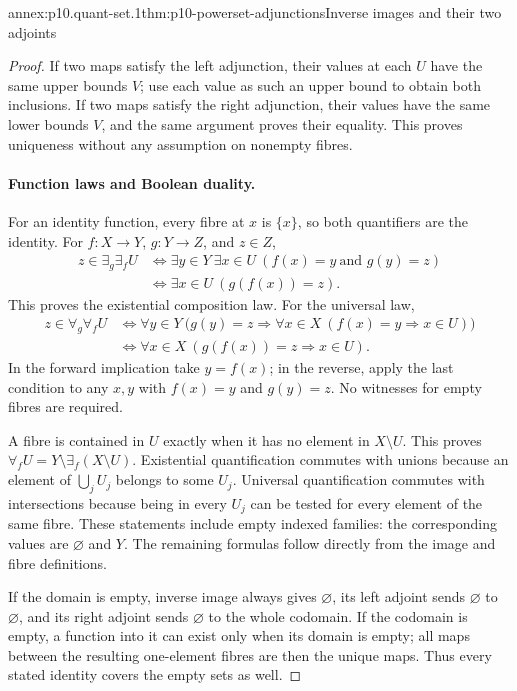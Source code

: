 \begin{annexitem}{annex:p10.quant-set.1}{thm:p10-powerset-adjunctions}{Inverse images and their two adjoints}
\begin{proof}
If two maps satisfy the left adjunction, their values at
each \(U\) have the same upper bounds \(V\); use each value
as such an upper bound to obtain both inclusions.
If two maps satisfy the right adjunction, their values
have the same lower bounds \(V\), and the same argument
proves their equality.
This proves uniqueness without any assumption on nonempty fibres.

\paragraph{Function laws and Boolean duality.}
For an identity function, every fibre at \(x\) is \(\{x\}\),
so both quantifiers are the identity.
For \(f:X\to Y\), \(g:Y\to Z\), and \(z\in Z\),
\[
\begin{aligned}
 z\in\exists_g\exists_fU
 &\Longleftrightarrow
     \exists y\in Y\ \exists x\in U\
                       (f(x)=y\ \text{and }g(y)=z)\\
 &\Longleftrightarrow
     \exists x\in U\ (g(f(x))=z).
\end{aligned}
\]
This proves the existential composition law.
For the universal law,
\[
\begin{aligned}
 z\in\forall_g\forall_fU
 &\Longleftrightarrow
   \forall y\in Y\
     \bigl(g(y)=z\Longrightarrow
       \forall x\in X\ (f(x)=y\Longrightarrow x\in U)\bigr)\\
 &\Longleftrightarrow
   \forall x\in X\ (g(f(x))=z\Longrightarrow x\in U).
\end{aligned}
\]
In the forward implication take \(y=f(x)\); in the reverse,
apply the last condition to any \(x,y\) with \(f(x)=y\)
and \(g(y)=z\).  No witnesses for empty fibres are required.

A fibre is contained in \(U\) exactly when it has no element
in \(X\setminus U\).  This proves
\(\forall_fU=Y\setminus\exists_f(X\setminus U)\).
Existential quantification commutes with unions because an
element of \(\bigcup_jU_j\) belongs to some \(U_j\).
Universal quantification commutes with intersections because
being in every \(U_j\) can be tested for every element of
the same fibre.  These statements include empty indexed
families: the corresponding values are \(\varnothing\)
and \(Y\).  The remaining formulas follow directly from
the image and fibre definitions.

If the domain is empty, inverse image always gives
\(\varnothing\), its left adjoint sends \(\varnothing\)
to \(\varnothing\), and its right adjoint sends
\(\varnothing\) to the whole codomain.  If the codomain is
empty, a function into it can exist only when its domain
is empty; all maps between the resulting one-element
fibres are then the unique maps.  Thus every stated
identity covers the empty sets as well.
\end{proof}
\end{annexitem}

